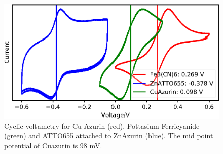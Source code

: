 \documentclass[11pt,a4paper,onecolumn]{article}
\begin{document}
\begin{figure}
  \centering
  \includegraphics{cyclic_voltametry.eps}
  \makeatletter
  \renewcommand{\fnum@figure}{\figurename~S\thefigure}
  \makeatother
  \caption{Cyclic voltametry for Cu-Azurin (red), Pottasium Ferricyanide (green) and ATTO655 attached to ZnAzurin (blue). The mid point potential of Cuazurin is 98 mV.}
  \label{SIfig: cyclic_voltametry}
\end{figure}


\end{document}
